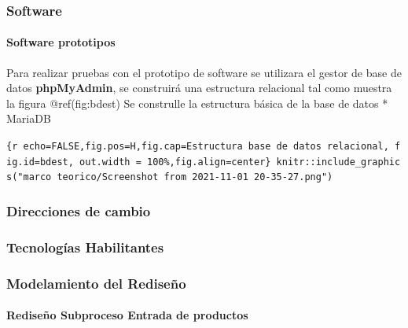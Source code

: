 \documentclass[11pt]{article}
\begin{document}
\hypertarget{software}{%
\subsubsection{Software}\label{software}}

\hypertarget{software-prototipos}{%
\paragraph{Software prototipos}\label{software-prototipos}}

Para realizar pruebas con el prototipo de software se utilizara el
gestor de base de datos \textbf{phpMyAdmin}, se construirá una
estructura relacional tal como muestra la figura @ref(fig:bdest) Se
construlle la estructura básica de la base de datos * MariaDB

\texttt{\{r\ echo=FALSE,fig.pos=\textquotesingle{}H\textquotesingle{},fig.cap=\textquotesingle{}Estructura\ base\ de\ datos\ relacional\textquotesingle{},\ fig.id=\textquotesingle{}bdest\textquotesingle{},\ out.width\ =\ \textquotesingle{}100\%\textquotesingle{},fig.align=\textquotesingle{}center\textquotesingle{}\}\ knitr::include\_graphics("marco\ teorico/Screenshot\ from\ 2021-11-01\ 20-35-27.png")}

\hypertarget{direcciones-de-cambio}{%
\subsubsection{Direcciones de cambio}\label{direcciones-de-cambio}}

\hypertarget{tecnologuxedas-habilitantes}{%
\subsubsection{Tecnologías
Habilitantes}\label{tecnologuxedas-habilitantes}}

\hypertarget{modelamiento-del-rediseuxf1o}{%
\subsubsection{Modelamiento del
Rediseño}\label{modelamiento-del-rediseuxf1o}}

\hypertarget{rediseuxf1o-subproceso-entrada-de-productos}{%
\paragraph{Rediseño Subproceso Entrada de
productos}\label{rediseuxf1o-subproceso-entrada-de-productos}}
\end{document}
